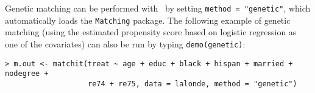 Genetic matching can be performed with \MatchIt\ by setting
\texttt{method = "genetic"}, which automatically loads the
\texttt{Matching} \citep{Sekhon04} package.  The following example of
genetic matching (using the estimated propensity score based on
logistic regression as one of the covariates) can also be run by
typing {\tt demo(genetic)}:
\begin{verbatim}
> m.out <- matchit(treat ~ age + educ + black + hispan + married + nodegree + 
                   re74 + re75, data = lalonde, method = "genetic")
\end{verbatim}



